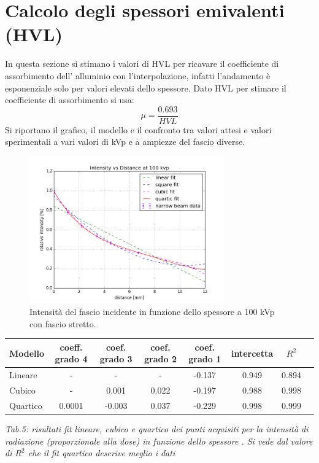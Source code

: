 \documentclass[a4paper]{article}
\begin{document}
\section{Calcolo degli spessori emivalenti (HVL)}
In questa sezione si stimano i valori di HVL per ricavare il coefficiente di assorbimento dell' alluminio con l'interpolazione, infatti l'andamento è esponenziale solo per valori elevati dello spessore. Dato HVL per stimare il coefficiente di assorbimento si usa: \begin{equation}
\mu =\frac{0.693}{HVL}
\end{equation} 
Si riportano il grafico, il modello e il confronto tra valori attesi e valori sperimentali a vari valori di kVp e a ampiezze del fascio diverse.  
\begin{figure}[H]
\centering
\includegraphics[width=0.75\textwidth]{hvl100pvk.png}
\caption{Intensità del fascio incidente in funzione dello spessore a 100 kVp con fascio stretto.}
\end{figure}

\begin{center} 
		
		\begin{tabular}{lccccccc}
			\hline
			\hline
			\textbf{Modello}	& \textbf{coeff. grado 4}&\textbf{coef. grado 3}&\textbf{coef. grado 2}& \textbf{coef. grado 1}& \textbf{intercetta}&  \textbf{$R^{2}$} 	 \\
			\hline
			\hline
			Lineare	&-&-&-&-0.137&0.949&0.894	\\
			Cubico	&-&0.001&0.022&-0.197&0.988&0.998\\
			Quartico &0.0001&-0.003&0.037&-0.229&0.998&0.999\\
			
			\hline
			\hline
		\end{tabular}
		\linebreak
		\emph{Tab.5: risultati fit lineare, cubico e quartico  dei punti acquisiti per la intensità di radiazione (proporzionale alla dose) in funzione dello spessore . Si vede dal valore di $R^{2}$ che il fit quartico descrive meglio i dati} 
	\end{center} 
\end{document}
